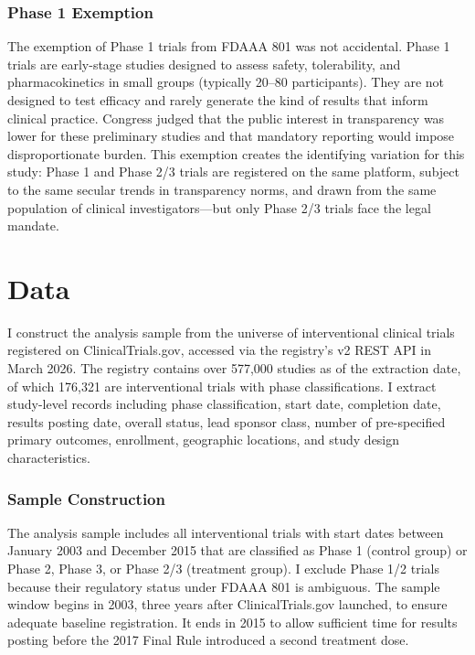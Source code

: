 \documentclass[12pt]{article}
\begin{document}
\subsubsection*{Phase 1 Exemption} The exemption of Phase 1 trials from FDAAA 801 was not accidental. Phase 1 trials are early-stage studies designed to assess safety, tolerability, and pharmacokinetics in small groups (typically 20--80 participants). They are not designed to test efficacy and rarely generate the kind of results that inform clinical practice. Congress judged that the public interest in transparency was lower for these preliminary studies and that mandatory reporting would impose disproportionate burden. This exemption creates the identifying variation for this study: Phase 1 and Phase 2/3 trials are registered on the same platform, subject to the same secular trends in transparency norms, and drawn from the same population of clinical investigators---but only Phase 2/3 trials face the legal mandate.

\section{Data}

I construct the analysis sample from the universe of interventional clinical trials registered on ClinicalTrials.gov, accessed via the registry's v2 REST API in March 2026. The registry contains over 577,000 studies as of the extraction date, of which 176,321 are interventional trials with phase classifications. I extract study-level records including phase classification, start date, completion date, results posting date, overall status, lead sponsor class, number of pre-specified primary outcomes, enrollment, geographic locations, and study design characteristics.

\subsubsection*{Sample Construction} The analysis sample includes all interventional trials with start dates between January 2003 and December 2015 that are classified as Phase 1 (control group) or Phase 2, Phase 3, or Phase 2/3 (treatment group). I exclude Phase 1/2 trials because their regulatory status under FDAAA 801 is ambiguous. The sample window begins in 2003, three years after ClinicalTrials.gov launched, to ensure adequate baseline registration. It ends in 2015 to allow sufficient time for results posting before the 2017 Final Rule introduced a second treatment dose.
\end{document}
